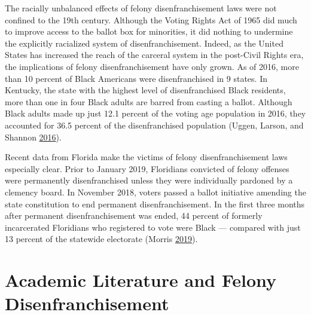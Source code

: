 \documentclass[12pt,]{article}
\begin{document}
The racially unbalanced effects of felony disenfranchisement laws were not confined to the 19th century. Although the Voting Rights Act of 1965 did much to improve access to the ballot box for minorities, it did nothing to undermine the explicitly racialized system of disenfranchisement. Indeed, as the United States has increased the reach of the carceral system in the post-Civil Rights era, the implications of felony disenfranchisement have only grown. As of 2016, more than 10 percent of Black Americans were disenfranchised in 9 states. In Kentucky, the state with the highest level of disenfranchised Black residents, more than one in four Black adults are barred from casting a ballot. Although Black adults made up just 12.1 percent of the voting age population in 2016, they accounted for 36.5 percent of the disenfranchised population (Uggen, Larson, and Shannon \protect\hyperlink{ref-sentencing_2016}{2016}).

Recent data from Florida make the victims of felony disenfranchisement laws especially clear. Prior to January 2019, Floridians convicted of felony offenses were permanently disenfranchised unless they were individually pardoned by a clemency board. In November 2018, voters passed a ballot initiative amending the state constitution to end permanent disenfranchisement. In the first three months after permanent disenfranchisement was ended, 44 percent of formerly incarcerated Floridians who registered to vote were Black --- compared with just 13 percent of the statewide electorate (Morris \protect\hyperlink{ref-Morris2019}{2019}).

\hypertarget{academic-literature-and-felony-disenfranchisement}{%
\section{Academic Literature and Felony Disenfranchisement}\label{academic-literature-and-felony-disenfranchisement}}
\end{document}

